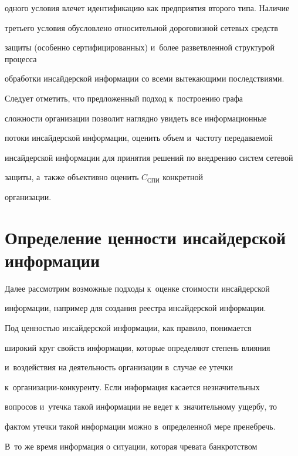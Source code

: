 одного условия влечет идентификацию как предприятия второго типа. Наличие 


треть\-его условия обусловлено относительной дороговизной сетевых средств 


защиты (особенно сертифицированных) и~более разветвленной структурой процесса 


обработки инсайдерской информации со всеми вытекающими последствиями.


     


     Следует отметить, что предложенный подход к~построению графа 


сложности организации позволит наглядно увидеть все информационные 


потоки инсайдерской информации, оценить объем и~частоту передаваемой 


инсайдерской информации для принятия решений по внедрению систем сетевой 


защиты, а~также объективно оценить $C_{\mathrm{СПИ}}$ конкретной 


организации.


     


\section{Определение ценности инсайдерской информации}





     Далее рассмотрим возможные подходы к~оценке стоимости инсайдерской 


информации, например для создания реестра инсайдерской информации.


     


     Под ценностью инсайдерской информации, как правило, понимается 


широкий круг свойств информации, которые определяют степень влияния 


и~воздействия на деятельность организации в~случае ее утечки 


 к~организации-конкуренту. Если информация касается незначительных 


вопросов и~утечка такой информации не ведет к~значительному ущербу, то 


фактом утечки такой информации можно в~определенной мере пренебречь. 


В~то же время информация о ситуации, которая чревата банкротством 


